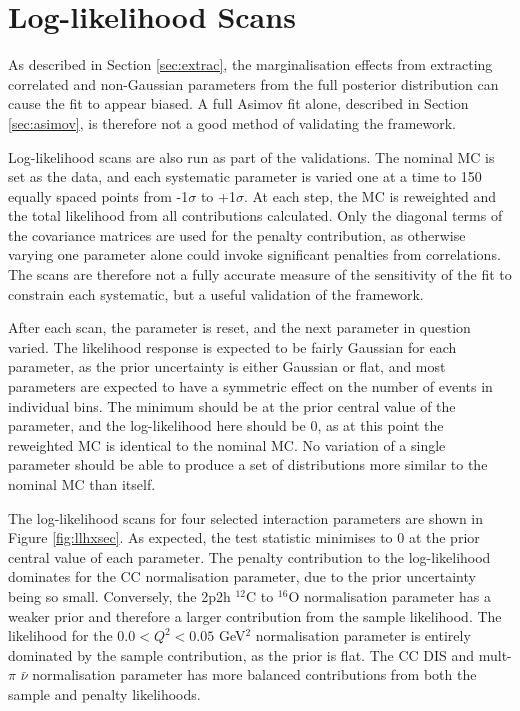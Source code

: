 \section{Log-likelihood Scans}\label{sec:llhscan}

As described in Section \ref{sec:extrac}, the marginalisation effects from extracting correlated and non-Gaussian parameters from the full posterior distribution can cause the fit to appear biased. A full Asimov fit alone, described in Section \ref{sec:asimov}, is therefore not a good method of validating the framework.

Log-likelihood scans are also run as part of the validations. The nominal MC is set as the data, and each systematic parameter is varied one at a time to 150 equally spaced points from -1$\sigma$ to +1$\sigma$. At each step, the MC is reweighted and the total likelihood from all contributions calculated. Only the diagonal terms of the covariance matrices are used for the penalty contribution, as otherwise varying one parameter alone could invoke significant penalties from correlations. The scans are therefore not a fully accurate measure of the sensitivity of the fit to constrain each systematic, but a useful validation of the framework.

After each scan, the parameter is reset, and the next parameter in question varied. The likelihood response is expected to be fairly Gaussian for each parameter, as the prior uncertainty is either Gaussian or flat, and most parameters are expected to have a symmetric effect on the number of events in individual bins. The minimum should be at the prior central value of the parameter, and the log-likelihood here should be 0, as at this point the reweighted MC is identical to the nominal MC. No variation of a single parameter should be able to produce a set of distributions more similar to the nominal MC than itself.

The log-likelihood scans for four selected interaction parameters are shown in Figure \ref{fig:llhxsec}. As expected, the test statistic minimises to 0 at the prior central value of each parameter. The penalty contribution to the log-likelihood dominates for the CC normalisation parameter, due to the prior uncertainty being so small. Conversely, the 2p2h $^{12}$C to $^{16}$O normalisation parameter has a weaker prior and therefore a larger contribution from the sample likelihood. The likelihood for the $0.0 < Q^2 < 0.05$ GeV$^2$ normalisation parameter is entirely dominated by the sample contribution, as the prior is flat. The CC DIS and mult-$\pi$ $\bar{\nu}$ normalisation parameter has more balanced contributions from both the sample and penalty likelihoods.

